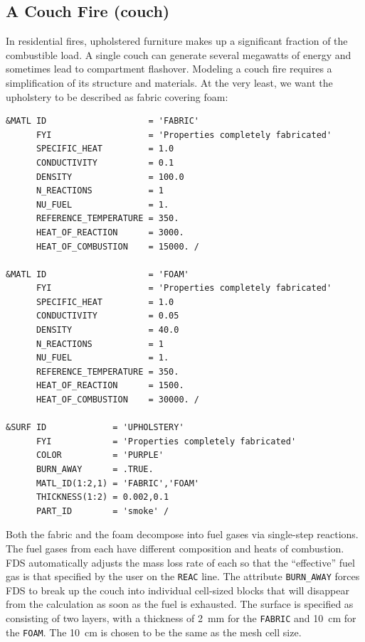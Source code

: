 \documentclass[11pt]{book}
\newcommand{\ct}{\tt\small}
\begin{document}
\clearpage
\subsection{A Couch Fire ({\bf couch}) }
\label{couch}

In residential fires, upholstered furniture makes up a significant fraction of the combustible load. A single couch can generate several
megawatts of energy and sometimes lead to compartment flashover. Modeling a couch fire requires a simplification of its structure and materials.
At the very least, we want the upholstery to be described as fabric covering foam:

\footnotesize
\begin{verbatim}
&MATL ID                    = 'FABRIC'
      FYI                   = 'Properties completely fabricated'
      SPECIFIC_HEAT         = 1.0
      CONDUCTIVITY          = 0.1
      DENSITY               = 100.0
      N_REACTIONS           = 1
      NU_FUEL               = 1.
      REFERENCE_TEMPERATURE = 350.
      HEAT_OF_REACTION      = 3000.
      HEAT_OF_COMBUSTION    = 15000. /

&MATL ID                    = 'FOAM'
      FYI                   = 'Properties completely fabricated'
      SPECIFIC_HEAT         = 1.0
      CONDUCTIVITY          = 0.05
      DENSITY               = 40.0
      N_REACTIONS           = 1
      NU_FUEL               = 1.
      REFERENCE_TEMPERATURE = 350.
      HEAT_OF_REACTION      = 1500.
      HEAT_OF_COMBUSTION    = 30000. /

&SURF ID             = 'UPHOLSTERY'
      FYI            = 'Properties completely fabricated'
      COLOR          = 'PURPLE'
      BURN_AWAY      = .TRUE.
      MATL_ID(1:2,1) = 'FABRIC','FOAM'
      THICKNESS(1:2) = 0.002,0.1
      PART_ID        = 'smoke' /
\end{verbatim} \normalsize

\noindent
Both the fabric and the foam decompose into fuel gases via single-step reactions. The fuel gases from each have different
composition and heats of combustion. FDS automatically adjusts the mass loss rate of each so that the ``effective'' fuel gas
is that specified by the user on the {\ct REAC} line. The attribute {\ct BURN\_AWAY} forces FDS to break up the couch into
individual cell-sized blocks that will disappear from the calculation as soon as the fuel is exhausted. The surface is specified
as consisting of two layers, with a thickness of 2~mm for the {\ct FABRIC} and 10~cm for the {\ct FOAM}. The 10~cm is chosen to be the
same as the mesh cell size.
\end{document}
